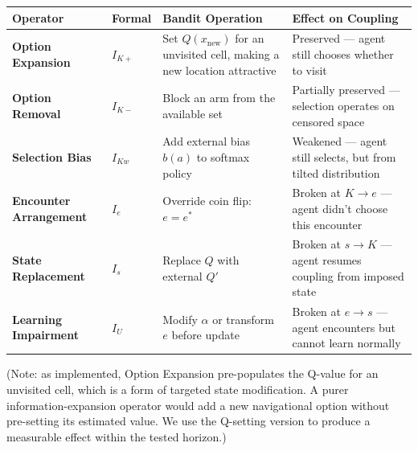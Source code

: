 \documentclass[
]{article}
\newcounter{none} %
\begin{document}
{\def\LTcaptype{none} %
\begin{longtable}[]{@{}
  >{\raggedright\arraybackslash}p{}
  >{\raggedright\arraybackslash}p{}
  >{\raggedright\arraybackslash}p{}
  >{\raggedright\arraybackslash}p{}@{}}
\toprule\noalign{}
\begin{minipage}[b]{\linewidth}\raggedright
Operator
\end{minipage} & \begin{minipage}[b]{\linewidth}\raggedright
Formal
\end{minipage} & \begin{minipage}[b]{\linewidth}\raggedright
Bandit Operation
\end{minipage} & \begin{minipage}[b]{\linewidth}\raggedright
Effect on Coupling
\end{minipage} \\
\midrule\noalign{}
\endhead
\bottomrule\noalign{}
\endlastfoot
\textbf{Option Expansion} & \(I_{K+}\) & Set \(Q(x_{\mathrm{new}})\) for
an unvisited cell, making a new location attractive & Preserved ---
agent still chooses whether to visit \\
\textbf{Option Removal} & \(I_{K-}\) & Block an arm from the available
set & Partially preserved --- selection operates on censored space \\
\textbf{Selection Bias} & \(I_{Kw}\) & Add external bias \(b(a)\) to
softmax policy & Weakened --- agent still selects, but from tilted
distribution \\
\textbf{Encounter Arrangement} & \(I_e\) & Override coin flip:
\(e = e^*\) & Broken at \(K \to e\) --- agent didn't choose this
encounter \\
\textbf{State Replacement} & \(I_s\) & Replace \(Q\) with external
\(Q'\) & Broken at \(s \to K\) --- agent resumes coupling from imposed
state \\
\textbf{Learning Impairment} & \(I_U\) & Modify \(\alpha\) or transform
\(e\) before update & Broken at \(e \to s\) --- agent encounters but
cannot learn normally \\
\end{longtable}
}

(Note: as implemented, Option Expansion pre-populates the Q-value for an
unvisited cell, which is a form of targeted state modification. A purer
information-expansion operator would add a new navigational option
without pre-setting its estimated value. We use the Q-setting version to
produce a measurable effect within the tested horizon.)
\end{document}

